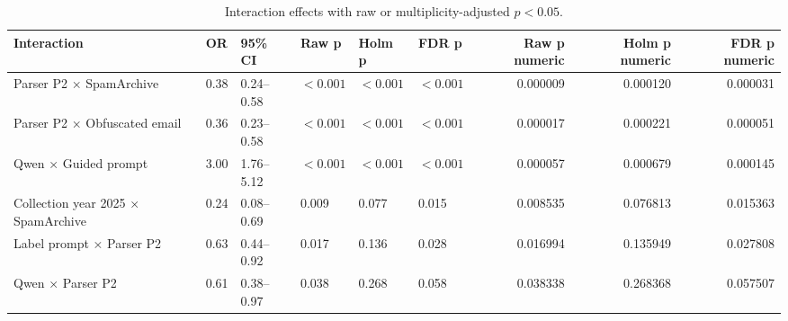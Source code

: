 \begin{table}[t]
\caption{Interaction effects with raw or multiplicity-adjusted $p<0.05$.}
\label{tab:gee_interactions_notable}
\begin{tabular}{llllllrrr}
\toprule
Interaction & OR & 95\% CI & Raw p & Holm p & FDR p & Raw p numeric & Holm p numeric & FDR p numeric \\
\midrule
Parser P2 × SpamArchive & 0.38 & 0.24--0.58 & $<0.001$ & $<0.001$ & $<0.001$ & 0.000009 & 0.000120 & 0.000031 \\
Parser P2 × Obfuscated email & 0.36 & 0.23--0.58 & $<0.001$ & $<0.001$ & $<0.001$ & 0.000017 & 0.000221 & 0.000051 \\
Qwen × Guided prompt & 3.00 & 1.76--5.12 & $<0.001$ & $<0.001$ & $<0.001$ & 0.000057 & 0.000679 & 0.000145 \\
Collection year 2025 × SpamArchive & 0.24 & 0.08--0.69 & 0.009 & 0.077 & 0.015 & 0.008535 & 0.076813 & 0.015363 \\
Label prompt × Parser P2 & 0.63 & 0.44--0.92 & 0.017 & 0.136 & 0.028 & 0.016994 & 0.135949 & 0.027808 \\
Qwen × Parser P2 & 0.61 & 0.38--0.97 & 0.038 & 0.268 & 0.058 & 0.038338 & 0.268368 & 0.057507 \\
\bottomrule
\end{tabular}
\end{table}
